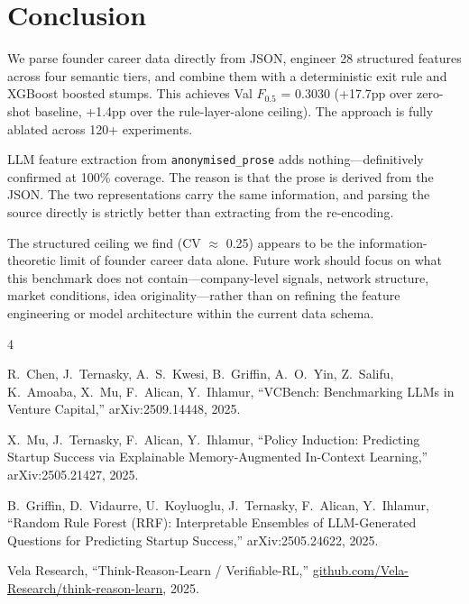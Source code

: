 \documentclass[10pt, conference]{IEEEtran}
\begin{document}
\section{Conclusion}

We parse founder career data directly from JSON, engineer 28 structured features across four semantic tiers, and combine them with a deterministic exit rule and XGBoost boosted stumps. This achieves Val $F_{0.5}$ = 0.3030 (+17.7pp over zero-shot baseline, +1.4pp over the rule-layer-alone ceiling). The approach is fully ablated across 120+ experiments.

LLM feature extraction from \texttt{anonymised\_prose} adds nothing---definitively confirmed at 100\% coverage. The reason is that the prose is derived from the JSON. The two representations carry the same information, and parsing the source directly is strictly better than extracting from the re-encoding.

The structured ceiling we find (CV $\approx$ 0.25) appears to be the information-theoretic limit of founder career data alone. Future work should focus on what this benchmark does not contain---company-level signals, network structure, market conditions, idea originality---rather than on refining the feature engineering or model architecture within the current data schema.

\begin{thebibliography}{4}

R.~Chen, J.~Ternasky, A.~S.~Kwesi, B.~Griffin, A.~O.~Yin, Z.~Salifu, K.~Amoaba, X.~Mu, F.~Alican, Y.~Ihlamur,
``VCBench: Benchmarking LLMs in Venture Capital,''
arXiv:2509.14448, 2025.

X.~Mu, J.~Ternasky, F.~Alican, Y.~Ihlamur,
``Policy Induction: Predicting Startup Success via Explainable Memory-Augmented In-Context Learning,''
arXiv:2505.21427, 2025.

B.~Griffin, D.~Vidaurre, U.~Koyluoglu, J.~Ternasky, F.~Alican, Y.~Ihlamur,
``Random Rule Forest (RRF): Interpretable Ensembles of LLM-Generated Questions for Predicting Startup Success,''
arXiv:2505.24622, 2025.

Vela Research,
``Think-Reason-Learn / Verifiable-RL,''
\url{github.com/Vela-Research/think-reason-learn}, 2025.

\end{thebibliography}
\end{document}
